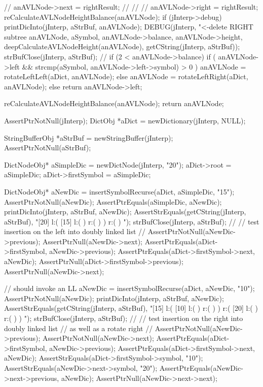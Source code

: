 {{{{//        anAVLNode->next                = rightResult;
//        //
//      }
      anAVLNode->right = rightResult;
      reCalculateAVLNodeHeightBalance(anAVLNode);
      if (jInterp->debug) {
        printDicInto(jInterp, aStrBuf, anAVLNode);
        DEBUG(jInterp, "<-delete RIGHT subtree %
            anAVLNode, aSymbol, anAVLNode->balance,
            anAVLNode->height, deepCalculateAVLNodeHeight(anAVLNode),
            getCString(jInterp, aStrBuf));
        strBufClose(jInterp, aStrBuf);
      }
      //
      if (2 < anAVLNode->balance) {
        if (
          anAVLNode->left &&
          strcmp(aSymbol, anAVLNode->left->symbol) > 0
          ) {
          anAVLNode = rotateLeftLeft(aDict, anAVLNode);
        } else {
          anAVLNode = rotateLeftRight(aDict, anAVLNode);
        }
      }
    } else {
      return anAVLNode->left;
    }
  }

  reCalculateAVLNodeHeightBalance(anAVLNode);
  return anAVLNode;
}
\stopCCode

\startCTest
  AssertPtrNotNull(jInterp);
  DictObj *aDict = newDictionary(jInterp, NULL);

  StringBufferObj *aStrBuf = newStringBuffer(jInterp);
  AssertPtrNotNull(aStrBuf);
  
  DictNodeObj* aSimpleDic = newDictNode(jInterp, "20");
  aDict->root             = aSimpleDic;
  aDict->firstSymbol      = aSimpleDic;

  DictNodeObj* aNewDic = insertSymbolRecurse(aDict, aSimpleDic, "15");
  AssertPtrNotNull(aNewDic);
  AssertPtrEquals(aSimpleDic, aNewDic);
  printDicInto(jInterp, aStrBuf, aNewDic);
  AssertStrEquals(getCString(jInterp, aStrBuf),
  "[20] l:( [15] l:(  ) r:(  )  ) r:(  ) ");
  strBufClose(jInterp, aStrBuf);
  //
  // test insertion on the left into doubly linked list
  //
  AssertPtrNotNull(aNewDic->previous);
  AssertPtrNull(aNewDic->next);
  AssertPtrEquals(aDict->firstSymbol, aNewDic->previous);
  AssertPtrEquals(aDict->firstSymbol->next, aNewDic);
  AssertPtrNull(aDict->firstSymbol->previous);
  AssertPtrNull(aNewDic->next);

  // should invoke an LL
  aNewDic = insertSymbolRecurse(aDict, aNewDic, "10");
  AssertPtrNotNull(aNewDic);
  printDicInto(jInterp, aStrBuf, aNewDic);
  AssertStrEquals(getCString(jInterp, aStrBuf),
  "[15] l:( [10] l:(  ) r:(  )  ) r:( [20] l:(  ) r:(  )  ) ");
  strBufClose(jInterp, aStrBuf);
  //
  // test insertion on the right into doubly linked list
  // as well as a rotate right
  //
  AssertPtrNotNull(aNewDic->previous);
  AssertPtrNotNull(aNewDic->next);
  AssertPtrEquals(aDict->firstSymbol, aNewDic->previous);
  AssertPtrEquals(aDict->firstSymbol->next, aNewDic);
  AssertStrEquals(aDict->firstSymbol->symbol, "10");
  AssertStrEquals(aNewDic->next->symbol, "20");
  AssertPtrEquals(aNewDic->next->previous, aNewDic);
  AssertPtrNull(aNewDic->next->next);

